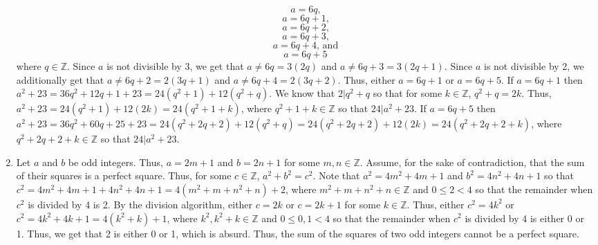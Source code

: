 \documentclass{article}
\newcommand{\integers}{\mathbb{Z}}
\begin{document}
\begin{enumerate}
		$$a = 6q\text{,}$$
		$$a = 6q + 1\text{,}$$
		$$a = 6q + 2\text{,}$$
		$$a = 6q + 3\text{,}$$
		$$a = 6q + 4\text{, and}$$
		$$a = 6q + 5$$
		where $q \in \integers$. Since $a$ is not divisible by 3, we get that $a \neq 6q = 3(2q)$ and $a \neq 6q + 3 = 3(2q + 1)$. Since $a$ is not divisible by 2, we additionally get that $a \neq 6q + 2 = 2(3q + 1)$ and $a \neq 6q + 4 = 2(3q + 2)$. Thus, either $a = 6q + 1$ or $a = 6q + 5$. If $a = 6q + 1$ then $a^2 + 23 = 36q^2 + 12q + 1 + 23 = 24(q^2 + 1) + 12(q^2 + q)$. We know that $2 | q^2 + q$ so that for some $k \in \integers$, $q^2 + q = 2k$. Thus, $a^2 + 23 = 24(q^2 + 1) + 12(2k) = 24(q^2 + 1 + k)$, where $q^2 + 1 + k \in \integers$ so that $24 | a^2 + 23$. If $a = 6q + 5$ then $a^2 + 23 = 36q^2 + 60q + 25 + 23 = 24(q^2 + 2q + 2) + 12(q^2 + q) = 24(q^2 + 2q + 2) + 12(2k) = 24(q^2 + 2q + 2 + k)$, where $q^2 + 2q + 2 + k \in \integers$ so that $24 | a^2 + 23$.
	\item
		Let $a$ and $b$ be odd integers. Thus, $a = 2m + 1$ and $b = 2n + 1$ for some $m, n \in \integers$. Assume, for the sake of contradiction, that the sum of their squares is a perfect square. Thus, for some $c \in \integers$, $a^2 + b^2 = c^2$. Note that $a^2 = 4m^2 + 4m + 1$ and $b^2 = 4n^2 + 4n + 1$ so that $c^2 = 4m^2 + 4m + 1 + 4n^2 + 4n + 1 = 4(m^2 + m + n^2 + n) + 2$, where $m^2 + m + n^2 + n \in \integers$ and $0 \leq 2 < 4$ so that the remainder when $c^2$ is divided by 4 is 2. By the division algorithm, either $c = 2k$ or $c = 2k + 1$ for some $k \in \integers$. Thus, either $c^2 = 4k^2$ or $c^2 = 4k^2 + 4k + 1 = 4(k^2 + k) + 1$, where $k^2, k^2 + k \in \integers$ and $0 \leq 0, 1 < 4$ so that the remainder when $c^2$ is divided by 4 is either 0 or 1. Thus, we get that 2 is either 0 or 1, which is absurd. Thus, the sum of the squares of two odd integers cannot be a perfect square.
\end{enumerate}
\end{document}
